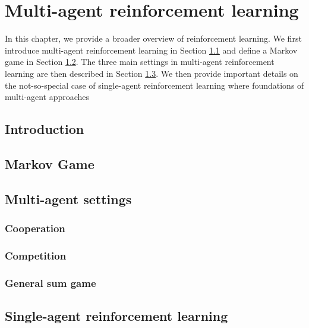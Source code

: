\chapter{Multi-agent reinforcement learning} \label{ch:marl}

\begin{chapter_outline}

In this chapter, we provide a broader overview of reinforcement learning.
We first introduce multi-agent reinforcement learning in Section \ref{sec:ch2_Introduction} and define a Markov game in Section \ref{sec:ch2_Markov_Game}.
The three main settings in multi-agent reinforcement learning are then described in Section \ref{sec:ch2_multi_agent_settings}.
We then provide important details on the not-so-special case of single-agent reinforcement learning where foundations of multi-agent approaches

\end{chapter_outline}


\section{Introduction} 
\label{sec:ch2_Introduction}

\section{Markov Game} 
\label{sec:ch2_Markov_Game}

\section{Multi-agent settings} 
\label{sec:ch2_multi_agent_settings}

\subsection{Cooperation} 
\label{sec:ch2_Cooperation}

\subsection{Competition} 
\label{sec:ch2_Competition}

\subsection{General sum game} 
\label{sec:ch2_general_sum_game}

\section{Single-agent reinforcement learning} 
\label{sec:ch2_single_agent_RL}
